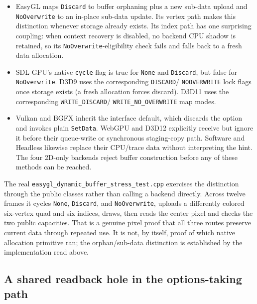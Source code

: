 \begin{itemize}
  \item EasyGL maps \texttt{Discard} to buffer orphaning plus a new sub-data upload and
    \texttt{NoOverwrite} to an in-place sub-data update. Its vertex path makes this distinction
    whenever storage already exists. Its index path has one surprising coupling: when context
    recovery is disabled, no backend CPU shadow is retained, so its
    \texttt{NoOverwrite}-eligibility check fails and falls back to a fresh data allocation.
  \item SDL GPU's native \texttt{cycle} flag is true for \texttt{None} and
    \texttt{Discard}, but false for \texttt{NoOverwrite}. D3D9 uses the corresponding
    \texttt{DISCARD}/%
    \texttt{NO}\allowbreak{}\texttt{OVERWRITE} lock flags once storage exists (a fresh
    allocation forces discard). D3D11 uses the corresponding
    \texttt{WRITE\_}\allowbreak{}\texttt{DISCARD}/%
    \texttt{WRITE\_}\allowbreak{}\texttt{NO\_OVERWRITE} map modes.
  \item Vulkan and BGFX inherit the interface default, which discards the option and invokes
    plain \texttt{SetData}. WebGPU and D3D12 explicitly receive but ignore it before their
    queue-write or synchronous staging-copy path. Software and Headless likewise replace their
    CPU/trace data without interpreting the hint. The four 2D-only backends reject buffer
    construction before any of these methods can be reached.
\end{itemize}

The real \texttt{easygl\_dynamic\_buffer\_stress\_test.cpp} exercises the distinction through
the public classes rather than calling a backend directly. Across twelve frames it cycles
\texttt{None}, \texttt{Discard}, and \texttt{NoOverwrite}, uploads a differently colored
six-vertex quad and six indices, draws, then reads the center pixel and checks the two public
capacities. That is a genuine pixel proof that all three routes preserve current data through
repeated use. It is not, by itself, proof of which native allocation primitive ran; the
orphan/sub-data distinction is established by the implementation read above.

\subsection{A shared readback hole in the options-taking path}

